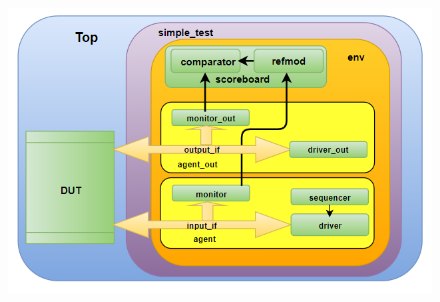 \documentclass[a4paper]{article}
\begin{document}
\begin{figure}[h]
  \centering  
  \includegraphics[width=0.6\linewidth]{pictures/uvm.png}
  \label{uvm_tb}
\end{figure}
        
\newpage


\end{document}
